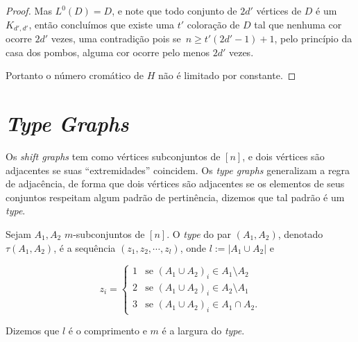 \begin{proof}
Mas $L^0(D) = D$, e note que todo conjunto de $2d'$ vértices de $D$ é um $K_{d',d'}$, então concluímos que existe uma $t'$ coloração de $D$ tal que nenhuma cor ocorre $2d'$ vezes, uma contradição pois se~$n \geq t'(2d'-1)+1$, pelo princípio da casa dos pombos, alguma cor ocorre pelo menos $2d'$ vezes.

Portanto o número cromático de $H$ não é limitado por constante.
\end{proof}


\section{\textit{Type Graphs}}

Os \textit{shift graphs} tem como vértices subconjuntos de $[n]$, e dois vértices são adjacentes se suas ``extremidades'' coincidem. Os \textit{type graphs} generalizam a regra de adjacência, de forma que dois vértices são adjacentes se os elementos de seus conjuntos respeitam algum padrão de pertinência, dizemos que tal padrão é um \textit{type}.

\begin{definicao}
Sejam $A_1, A_2$ $m$-subconjuntos de $[n]$. O \textit{type} do par $(A_1,A_2)$, denotado $\tau(A_1,A_2)$, é a sequência $(z_1, z_2,\cdots,z_l)$, onde $l := |A_1\cup A_2|$ e

\[ z_i = \begin{cases} 
      1 & \text{se } (A_1\cup A_2)_i \in A_1\setminus A_2\\
      2 & \text{se } (A_1\cup A_2)_i \in A_2\setminus A_1\\
      3 & \text{se } (A_1\cup A_2)_i \in A_1\cap A_2.
   \end{cases}
\]

Dizemos que $l$ é o comprimento e $m$ é a largura do \textit{type}.
\end{definicao}

